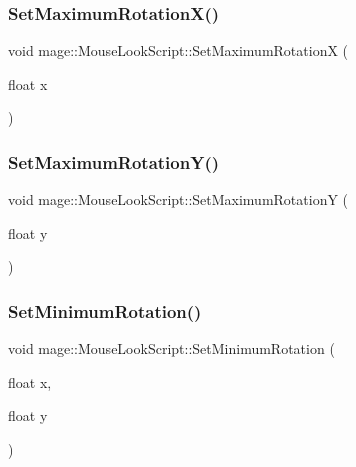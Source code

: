 \hypertarget{classmage_1_1_mouse_look_script_a080934c7e393603beda98ae0096e3ab7}{}\label{classmage_1_1_mouse_look_script_a080934c7e393603beda98ae0096e3ab7} 
\subsubsection{\texorpdfstring{Set\+Maximum\+Rotation\+X()}{SetMaximumRotationX()}}
{\footnotesize\ttfamily void mage\+::\+Mouse\+Look\+Script\+::\+Set\+Maximum\+RotationX (\begin{DoxyParamCaption}\item[{float}]{x }\end{DoxyParamCaption})}

\hypertarget{classmage_1_1_mouse_look_script_ab99d73d8ec44b4e484dffc63bf3f39b1}{}\label{classmage_1_1_mouse_look_script_ab99d73d8ec44b4e484dffc63bf3f39b1} 
\subsubsection{\texorpdfstring{Set\+Maximum\+Rotation\+Y()}{SetMaximumRotationY()}}
{\footnotesize\ttfamily void mage\+::\+Mouse\+Look\+Script\+::\+Set\+Maximum\+RotationY (\begin{DoxyParamCaption}\item[{float}]{y }\end{DoxyParamCaption})}

\hypertarget{classmage_1_1_mouse_look_script_ac84f53324f75f360ea87a9565c031623}{}\label{classmage_1_1_mouse_look_script_ac84f53324f75f360ea87a9565c031623} 
\subsubsection{\texorpdfstring{Set\+Minimum\+Rotation()}{SetMinimumRotation()}\hspace{0.1cm}{\footnotesize\ttfamily [1/3]}}
{\footnotesize\ttfamily void mage\+::\+Mouse\+Look\+Script\+::\+Set\+Minimum\+Rotation (\begin{DoxyParamCaption}\item[{float}]{x,  }\item[{float}]{y }\end{DoxyParamCaption})}

